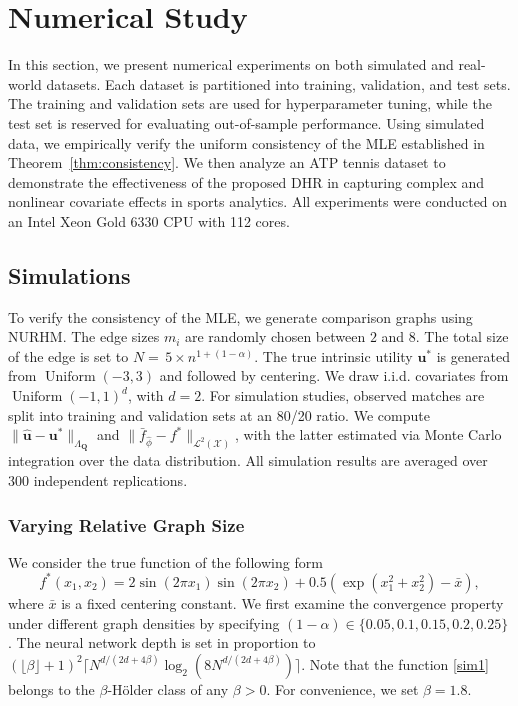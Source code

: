 \documentclass[
  12pt]{article}
\begin{document}
\section{Numerical Study}

In this section, we present numerical experiments on both simulated and real-world datasets. Each dataset is partitioned into training, validation, and test sets. The training and validation sets are used for hyperparameter tuning, while the test set is reserved for evaluating out-of-sample performance. Using simulated data, we empirically verify the uniform consistency of the MLE established in Theorem~\ref{thm:consistency}. We then analyze an ATP tennis dataset to demonstrate the effectiveness of the proposed DHR in capturing complex and nonlinear covariate effects in sports analytics. All experiments were conducted on an Intel Xeon Gold 6330 CPU with 112 cores.


\subsection{Simulations}

To verify the consistency of the MLE, we generate comparison graphs using NURHM. The edge sizes $m_i$ are randomly chosen between $2$ and $8$. The total size of the edge is set to $N=\,5\times n^{1+(1-\alpha)}$. The true intrinsic utility $\boldsymbol{u}^*$ is generated from $\operatorname{Uniform}(-3,3)$ and followed by centering. We draw i.i.d. covariates from $\operatorname{Uniform}(-1, 1)^d$, with $d=2$. For simulation studies, observed matches are split into training and validation sets at an 80/20 ratio. We compute $\|\widehat{\boldsymbol{u}} - \boldsymbol{u}^*\|_{\Lambda_{\boldsymbol{Q}}}$ and $\|\bar{f}_{\widehat{\phi}} - f^*\|_{\mathcal{L}^2(\mathcal{X})}$, with the latter estimated via Monte Carlo integration over the data distribution. All simulation results are averaged over 300 independent replications.


\subsubsection{Varying Relative Graph Size} \label{subsubsec:sim1}
We consider the true function of the following form
\begin{equation}\label{sim1}
    f^*(x_1,x_2)=2\sin(2\pi x_1)\sin(2\pi x_2)+0.5(\exp(x_1^2+x_2^2)-\bar{x}),
\end{equation}
 where $\bar{x}$ is a fixed centering constant. We first examine the convergence property under different graph densities by specifying $(1-\alpha) \in \{0.05, 0.1, 0.15, 0.2, 0.25\}$. The neural network depth is set in proportion to $(\lfloor\beta\rfloor+1)^2\lceil N^{d/(2d+4\beta)} \log _2(8 N^{d/(2d+4\beta)})\rceil$. Note that the function \eqref{sim1} belongs to the $\beta$-Hölder class of any $\beta>0$. For convenience, we set $\beta=1.8$.
\end{document}
